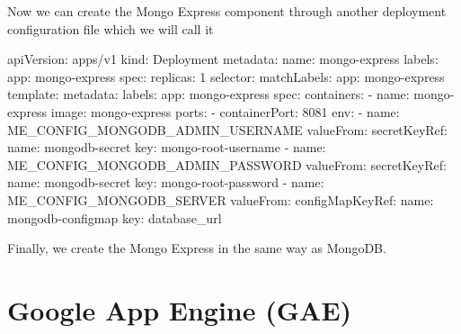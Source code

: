 Now we can create the Mongo Express component through another deployment configuration file which we will call it
\begin{block}
apiVersion: apps/v1
kind: Deployment
metadata:
  name: mongo-express
  labels:
    app: mongo-express
spec:
  replicas: 1
  selector:
    matchLabels:
      app: mongo-express
  template:
    metadata:
      labels:
        app: mongo-express
    spec:
      containers:
      - name: mongo-express
        image: mongo-express
        ports:
        - containerPort: 8081
        env:
        - name: ME_CONFIG_MONGODB_ADMIN_USERNAME
          valueFrom:
            secretKeyRef:
              name: mongodb-secret
              key: mongo-root-username
        - name: ME_CONFIG_MONGODB_ADMIN_PASSWORD
          valueFrom:
            secretKeyRef:
              name: mongodb-secret
              key: mongo-root-password
        - name: ME_CONFIG_MONGODB_SERVER
          valueFrom:
            configMapKeyRef:
              name: mongodb-configmap
              key: database_url
\end{block}

Finally, we create the Mongo Express in the same way as MongoDB\@.

\section{Google App Engine (GAE)}

